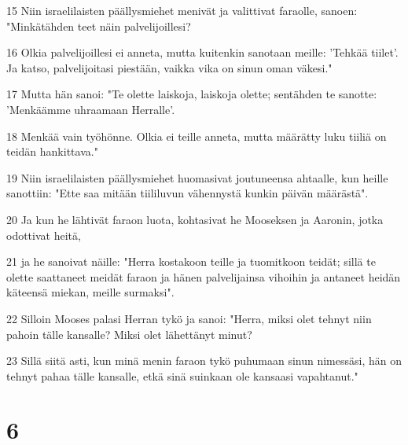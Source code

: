\par 15 Niin israelilaisten päällysmiehet menivät ja valittivat faraolle, sanoen: "Minkätähden teet näin palvelijoillesi?
\par 16 Olkia palvelijoillesi ei anneta, mutta kuitenkin sanotaan meille: 'Tehkää tiilet'. Ja katso, palvelijoitasi piestään, vaikka vika on sinun oman väkesi."
\par 17 Mutta hän sanoi: "Te olette laiskoja, laiskoja olette; sentähden te sanotte: 'Menkäämme uhraamaan Herralle'.
\par 18 Menkää vain työhönne. Olkia ei teille anneta, mutta määrätty luku tiiliä on teidän hankittava."
\par 19 Niin israelilaisten päällysmiehet huomasivat joutuneensa ahtaalle, kun heille sanottiin: "Ette saa mitään tiililuvun vähennystä kunkin päivän määrästä".
\par 20 Ja kun he lähtivät faraon luota, kohtasivat he Mooseksen ja Aaronin, jotka odottivat heitä,
\par 21 ja he sanoivat näille: "Herra kostakoon teille ja tuomitkoon teidät; sillä te olette saattaneet meidät faraon ja hänen palvelijainsa vihoihin ja antaneet heidän käteensä miekan, meille surmaksi".
\par 22 Silloin Mooses palasi Herran tykö ja sanoi: "Herra, miksi olet tehnyt niin pahoin tälle kansalle? Miksi olet lähettänyt minut?
\par 23 Sillä siitä asti, kun minä menin faraon tykö puhumaan sinun nimessäsi, hän on tehnyt pahaa tälle kansalle, etkä sinä suinkaan ole kansaasi vapahtanut."

\chapter{6}

